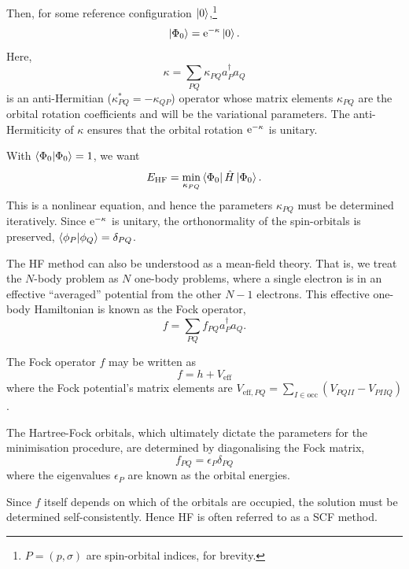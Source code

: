 Then, for some reference configuration $\ket 0$,\footnote{$P=(p,\sigma)$ are spin-orbital indices, for brevity.}
\begin{equation}
\ket{\Phi_0} = \mathrm{e}^{-\kappa} \ket 0.
\end{equation}
Here,
\begin{equation}
\kappa = \sum_{PQ} \kappa_{PQ}a_P^\dag a_Q
\end{equation}
is an anti-Hermitian ($\kappa_{PQ}^* = -\kappa_{QP}$) operator whose matrix elements $\kappa_{PQ}$ are the orbital rotation coefficients and will be the variational parameters. The anti-Hermiticity of $\kappa$ ensures that the orbital rotation $\mathrm{e}^{-\kappa}$ is unitary.

With $\braket{\Phi_0}=1$, we want
\begin{equation}
E_\mathrm{HF} = \min_{\kappa_{PQ}}\bra{\Phi_0}\hat H\ket{\Phi_0}.
\end{equation}
This is a nonlinear equation, and hence the parameters $\kappa_{PQ}$ must be determined iteratively. Since $\mathrm{e}^{-\kappa}$ is unitary, the orthonormality of the spin-orbitals is preserved, $\bra{\phi_P}\ket{\phi_Q} = \delta_{PQ}$.

The \gls{HF} method can also be understood as a mean-field theory. That is, we treat the $N$-body problem as $N$ one-body problems, where a single electron is in an effective ``averaged'' potential from the other $N-1$ electrons. This effective one-body Hamiltonian is known as the Fock operator,
\begin{equation}
    \label{eq:fock-operator}
    f = \sum_{PQ} f_{PQ} a_P^\dag a_Q.
\end{equation}

The Fock operator $f$ may be written as
\begin{equation}
    f = h + V_\mathrm{eff}
\end{equation}
where the Fock potential's matrix elements are $V_{\mathrm{eff},PQ}=\sum_{I\in\mathrm{occ}}(V_{PQII}-V_{PIIQ})$.

The Hartree-Fock orbitals, which ultimately dictate the parameters for the minimisation procedure, are determined by diagonalising the Fock matrix,
\begin{equation}
    f_{PQ} = \epsilon_P\delta_{PQ}
\end{equation}
where the eigenvalues $\epsilon_P$ are known as the orbital energies.

Since $f$ itself depends on which of the orbitals are occupied, the solution must be determined self-consistently. Hence \gls{HF} is often referred to as a \gls{SCF} method.

